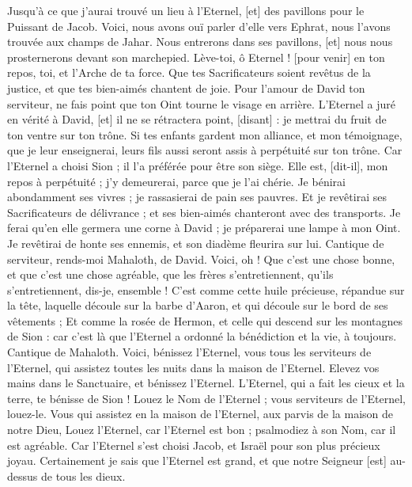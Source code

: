 \begin{multicols}{2}
Jusqu’à ce que j'aurai trouvé un lieu à l'Eternel, [et] des pavillons pour le Puissant de Jacob.
Voici, nous avons ouï parler d'elle vers Ephrat, nous l'avons trouvée aux champs de Jahar.
Nous entrerons dans ses pavillons, [et] nous nous prosternerons devant son marchepied.
Lève-toi, ô Eternel ! [pour venir] en ton repos, toi, et l'Arche de ta force.
Que tes Sacrificateurs soient revêtus de la justice, et que tes bien-aimés chantent de joie.
Pour l'amour de David ton serviteur, ne fais point que ton Oint tourne le visage en arrière.
L'Eternel a juré en vérité à David, [et] il ne se rétractera point, [disant] : je mettrai du fruit de ton ventre sur ton trône.
Si tes enfants gardent mon alliance, et mon témoignage, que je leur enseignerai, leurs fils aussi seront assis à perpétuité sur ton trône.
Car l'Eternel a choisi Sion ; il l'a préférée pour être son siège.
Elle est, [dit-il], mon repos à perpétuité ; j'y demeurerai, parce que je l'ai chérie.
Je bénirai abondamment ses vivres ; je rassasierai de pain ses pauvres.
Et je revêtirai ses Sacrificateurs de délivrance ; et ses bien-aimés chanteront avec des transports.
Je ferai qu'en elle germera une corne à David ; je préparerai une lampe à mon Oint.
Je revêtirai de honte ses ennemis, et son diadème fleurira sur lui.
\VerseOne{}Cantique de serviteur, rends-moi Mahaloth, de David. Voici, oh ! Que c'est une chose bonne, et que c'est une chose agréable, que les frères s'entretiennent, qu'ils s'entretiennent, dis-je, ensemble !
C'est comme cette huile précieuse, répandue sur la tête, laquelle découle sur la barbe d'Aaron, et qui découle sur le bord de ses vêtements ;
Et comme la rosée de Hermon, et celle qui descend sur les montagnes de Sion : car c'est là que l'Eternel a ordonné la bénédiction et la vie, à toujours.
\VerseOne{}Cantique de Mahaloth. Voici, bénissez l'Eternel, vous tous les serviteurs de l'Eternel, qui assistez toutes les nuits dans la maison de l'Eternel.
Elevez vos mains dans le Sanctuaire, et bénissez l'Eternel.
L'Eternel, qui a fait les cieux et la terre, te bénisse de Sion !
\VerseOne{}Louez le Nom de l’Eternel ; vous serviteurs de l'Eternel, louez-le.
Vous qui assistez en la maison de l'Eternel, aux parvis de la maison de notre Dieu,
Louez l'Eternel, car l'Eternel est bon ; psalmodiez à son Nom, car il est agréable.
Car l'Eternel s'est choisi Jacob, et Israël pour son plus précieux joyau.
Certainement je sais que l'Eternel est grand, et que notre Seigneur [est] au-dessus de tous les dieux.

\end{multicols}
